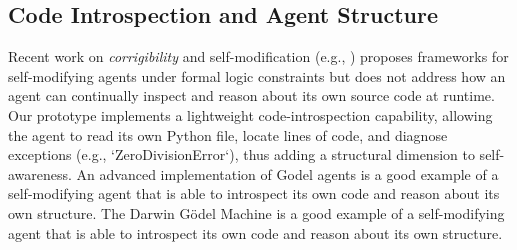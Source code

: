 \documentclass[conference]{IEEEtran}
\begin{document}
\subsection{Code Introspection and Agent Structure}
Recent work on \emph{corrigibility} and self-modification (e.g., \cite{Soares2015}) proposes frameworks for self-modifying agents under formal logic constraints but does not address how an agent can continually inspect and reason about its own source code at runtime. Our prototype implements a lightweight code-introspection capability, allowing the agent to read its own Python file, locate lines of code, and diagnose exceptions (e.g., `ZeroDivisionError`), thus adding a structural dimension to self-awareness.  An advanced implementation of Godel agents \cite{yin2024godel} is a good example of a self-modifying agent that is able to introspect its own code and reason about its own structure.  The Darwin Gödel Machine \cite{zhang2025darwin} is a good example of a self-modifying agent that is able to introspect its own code and reason about its own structure.
\end{document}
